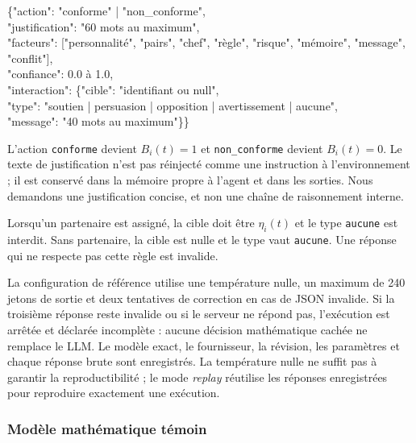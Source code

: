 \documentclass[10pt,a4paper]{article}
\newcommand{\code}[1]{\texttt{\small #1}}
\begin{document}
\begin{tcolorbox}[
  colback=Mist,colframe=Rule,boxrule=0.6pt,arc=1mm,
  left=3mm,right=3mm,top=1.5mm,bottom=1.5mm]
\ttfamily\small
\{"action": "conforme" | "non\_conforme",\\
\hspace*{4mm}"justification": "60 mots au maximum",\\
\hspace*{4mm}"facteurs": ["personnalité", "pairs", "chef", "règle",
"risque", "mémoire", "message", "conflit"],\\
\hspace*{4mm}"confiance": 0.0 à 1.0,\\
\hspace*{4mm}"interaction": \{"cible": "identifiant ou null",\\
\hspace*{11mm}"type": "soutien | persuasion | opposition |
avertissement | aucune",\\
\hspace*{11mm}"message": "40 mots au maximum"\}\}
\end{tcolorbox}

L’action \code{conforme} devient $B_i(t)=1$ et
\code{non\_conforme} devient $B_i(t)=0$. Le texte de justification n’est pas
réinjecté comme une instruction à l’environnement ; il est conservé dans la
mémoire propre à l’agent et dans les sorties. Nous demandons une justification
concise, et non une chaîne de raisonnement interne.

Lorsqu’un partenaire est assigné, la cible doit être $\eta_i(t)$ et le type
\code{aucune} est interdit. Sans partenaire, la cible est nulle et le type vaut
\code{aucune}. Une réponse qui ne respecte pas cette règle est invalide.

La configuration de référence utilise une température nulle, un maximum de
240 jetons de sortie et deux tentatives de correction en cas de JSON invalide.
Si la troisième réponse reste invalide ou si le serveur ne répond pas,
l’exécution est arrêtée et déclarée incomplète : aucune décision mathématique
cachée ne remplace le LLM. Le modèle exact, le fournisseur, la révision, les
paramètres et chaque réponse brute sont enregistrés. La température nulle ne
suffit pas à garantir la reproductibilité ; le mode \emph{replay} réutilise les
réponses enregistrées pour reproduire exactement une exécution.

\subsubsection{Modèle mathématique témoin}
\end{document}
